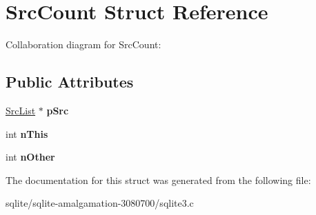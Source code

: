 \hypertarget{struct_src_count}{\section{Src\+Count Struct Reference}
\label{struct_src_count}
}


Collaboration diagram for Src\+Count\+:
\subsection*{Public Attributes}
\begin{DoxyCompactItemize}
\item 
\hypertarget{struct_src_count_a7087f00bcaed39cc5032462d7262f4ff}{\hyperlink{struct_src_list}{Src\+List} $\ast$ {\bfseries p\+Src}}\label{struct_src_count_a7087f00bcaed39cc5032462d7262f4ff}

\item 
\hypertarget{struct_src_count_a1aaa40ff75460ebc7778ea63aca14d4d}{int {\bfseries n\+This}}\label{struct_src_count_a1aaa40ff75460ebc7778ea63aca14d4d}

\item 
\hypertarget{struct_src_count_a5666f8571b2877fdadfe95364ffb5b80}{int {\bfseries n\+Other}}\label{struct_src_count_a5666f8571b2877fdadfe95364ffb5b80}

\end{DoxyCompactItemize}


The documentation for this struct was generated from the following file\+:\begin{DoxyCompactItemize}
\item 
sqlite/sqlite-\/amalgamation-\/3080700/sqlite3.\+c\end{DoxyCompactItemize}
